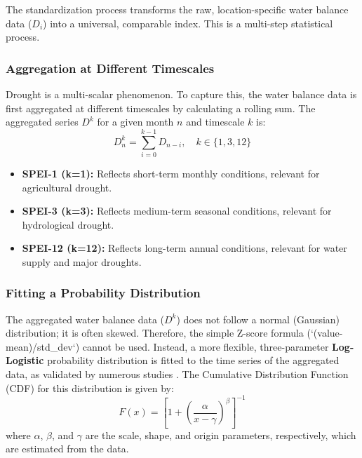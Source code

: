 \documentclass[12pt, a4paper]{article}
\begin{document}
The standardization process transforms the raw, location-specific water balance data ($D_i$) into a universal, comparable index. This is a multi-step statistical process.

\subsubsection{Aggregation at Different Timescales}
Drought is a multi-scalar phenomenon. To capture this, the water balance data is first aggregated at different timescales by calculating a rolling sum. The aggregated series $D^k$ for a given month $n$ and timescale $k$ is:
\[ D^k_n = \sum_{i=0}^{k-1} D_{n-i}, \quad k \in \{1, 3, 12\} \]
\begin{itemize}
    \item \textbf{SPEI-1 (k=1):} Reflects short-term monthly conditions, relevant for agricultural drought.
    \item \textbf{SPEI-3 (k=3):} Reflects medium-term seasonal conditions, relevant for hydrological drought.
    \item \textbf{SPEI-12 (k=12):} Reflects long-term annual conditions, relevant for water supply and major droughts.
\end{itemize}

\subsubsection{Fitting a Probability Distribution}
The aggregated water balance data ($D^k$) does not follow a normal (Gaussian) distribution; it is often skewed. Therefore, the simple Z-score formula (`(value-mean)/std\_dev`) cannot be used. Instead, a more flexible, three-parameter \textbf{Log-Logistic} probability distribution is fitted to the time series of the aggregated data, as validated by numerous studies \cite{vicente2010multiscalar, stagge2015candidate}. The Cumulative Distribution Function (CDF) for this distribution is given by:
\[ F(x) = \left[1 + \left(\frac{\alpha}{x-\gamma}\right)^\beta\right]^{-1} \]
where $\alpha$, $\beta$, and $\gamma$ are the scale, shape, and origin parameters, respectively, which are estimated from the data.
\end{document}
